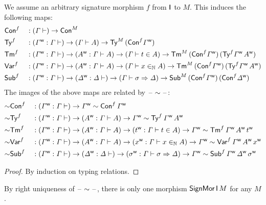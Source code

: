 \begin{lemma}
  We assume an arbitrary signature morphism $f$ from $\I$ to $M$. This
  induces the following maps:
\begin{alignat*}{5}
  &
  \mor{\Con}
  && :
   (\GG \vdash) \ra \model\Con
   \\
  &
  \mor{\Ty}
  && :
   (\wf\GG:\GG \vdash) \ra (\GG\vdash A)\ra\model\Ty\,(\mor\Con\wf\GG)
   \\
  &
  \mor{\Tm}
  && :
  (\wf\GG:\GG \vdash) \ra (\wf{A}:\GG\vdash A)\ra
  (\GG\vdash t \in A)\ra\model\Tm\,(\mor\Con\wf\GG)\,
  (\mor\Ty\wf\GG\,\wf{A})
   \\
  &
  \mor{\Var}
  && :
  (\wf\GG:\GG \vdash) \ra (\wf{A}:\GG\vdash A)\ra
  (\GG\vdash x \invar A)\ra\model\Tm\,(\mor\Con\wf\GG)\,
  (\mor\Ty\wf\GG\,\wf{A})
   \\
  &
  \mor{\Sub}
  && :
  (\wf\GG:\GG \vdash) \ra
  (\wf\GD:\GD \vdash) \ra
  (\GG\vdash \sigma \Rightarrow \GD)\ra\model\Sub\,(\mor\Con\wf\GG)\,
  (\mor\Con\wf\GD)
\end{alignat*}
The images of the above maps are related by $\blank\sim\blank$:
\begin{alignat*}{5}
  &
  {\sim}\mor{\Con}
  && :
  (\wf\GG : \GG \vdash) \ra \wf\GG\sim \mor\Con\,\wf\GG
  \\
  &
  {\sim}\mor{\Ty}
  && :
  (\wf\GG : \GG \vdash) \ra
  (\wf{A} : \GG \vdash A) \ra
  \wf\GG\sim \mor\Ty\,\wf\GG\,\wf{A}
  \\
  &
  {\sim}\mor{\Tm}
  && :
  (\wf\GG : \GG \vdash) \ra
  (\wf{A} : \GG \vdash A) \ra
  (\wf{t} : \GG \vdash t \in A) \ra
  \wf\GG\sim \mor\Tm\,\wf\GG\,\wf{A}\,\wf{t}
  \\
  &
  {\sim}\mor{\Var}
  && :
  (\wf\GG : \GG \vdash) \ra
  (\wf{A} : \GG \vdash A) \ra
  (\wf{x} : \GG \vdash x \invar A) \ra
  \wf\GG\sim \mor\Var\,\wf\GG\,\wf{A}\,\wf{x}
  \\
  &
  {\sim}\mor{\Sub}
  && :
  (\wf\GG : \GG \vdash) \ra
  (\wf{\GD} : \GD \vdash) \ra
  (\wf{\sigma} : \GG \vdash \sigma \Rightarrow \GD) \ra
  \wf\GG\sim \mor\Sub\,\wf\GG\,\wf{\GD}\,\wf{\sigma}
\end{alignat*}
\end{lemma}
\begin{proof}
  By induction on typing relations.
\end{proof}

\begin{corollary}\label{lem:uniq}
  By right uniqueness of $\blank\sim\blank$, there is only one
  morphism $\SignMor\,\I\,M$ for any $M$.
\end{corollary}

